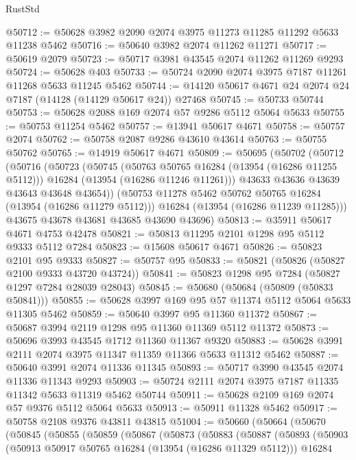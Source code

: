 \begin{lexlean}{RustStd}
\begin{coremodule}
@50712 := @50628 @3982 @2090 @2074 @3975 @11273 @11285 @11292 @5633 @11238 @5462
@50716 := @50640 @3982 @2074 @11262 @11271
@50717 := @50619 @2079
@50723 := @50717 @3981 @43545 @2074 @11262 @11269 @9293
@50724 := @50628 @403
@50733 := @50724 @2090 @2074 @3975 @7187 @11261 @11268 @5633 @11245 @5462
@50744 := @14120 @50617 @4671 @24 @2074 @24 @7187 (@14128 (@14129 @50617 @24)) @27468
@50745 := @50733 @50744
@50753 := @50628 @2088 @169 @2074 @57 @9286 @5112 @5064 @5633
@50755 := @50753 @11254 @5462
@50757 := @13941 @50617 @4671
@50758 := @50757 @2074
@50762 := @50758 @2087 @9286 @43610 @43614
@50763 := @50755 @50762
@50765 := @14919 @50617 @4671
@50809 := @50695
    (@50702
      (@50712
        (@50716
          (@50723
            (@50745
              (@50763 @50765 @16284 (@13954 (@16286 @11255 @5112)))
              @16284
              (@13954 (@16286 @11246 @11261)))
            @43633
            @43636
            @43639
            @43643
            @43648
            @43654))
        (@50753 @11278 @5462 @50762 @50765 @16284 (@13954 (@16286 @11279 @5112)))
        @16284
        (@13954 (@16286 @11239 @11285)))
      @43675
      @43678
      @43681
      @43685
      @43690
      @43696)
@50813 := @35911 @50617 @4671 @4753 @42478
@50821 := @50813 @11295 @2101 @1298 @95 @5112 @9333 @5112 @7284
@50823 := @15608 @50617 @4671
@50826 := @50823 @2101 @95 @9333
@50827 := @50757 @95
@50833 := @50821 (@50826 (@50827 @2100 @9333 @43720 @43724))
@50841 := @50823 @1298 @95 @7284 (@50827 @1297 @7284 @28039 @28043)
@50845 := @50680 (@50684 (@50809 (@50833 @50841)))
@50855 := @50628 @3997 @169 @95 @57 @11374 @5112 @5064 @5633 @11305 @5462
@50859 := @50640 @3997 @95 @11360 @11372
@50867 := @50687 @3994 @2119 @1298 @95 @11360 @11369 @5112 @11372
@50873 := @50696 @3993 @43545 @1712 @11360 @11367 @9320
@50883 := @50628 @3991 @2111 @2074 @3975 @11347 @11359 @11366 @5633 @11312 @5462
@50887 := @50640 @3991 @2074 @11336 @11345
@50893 := @50717 @3990 @43545 @2074 @11336 @11343 @9293
@50903 := @50724 @2111 @2074 @3975 @7187 @11335 @11342 @5633 @11319 @5462 @50744
@50911 := @50628 @2109 @169 @2074 @57 @9376 @5112 @5064 @5633
@50913 := @50911 @11328 @5462
@50917 := @50758 @2108 @9376 @43811 @43815
@51004 := @50660
    (@50664
      (@50670
        (@50845
          (@50855
            (@50859
              (@50867
                (@50873
                  (@50883
                    (@50887
                      (@50893
                        (@50903
                          (@50913 @50917 @50765 @16284 (@13954 (@16286 @11329 @5112)))
                          @16284

\end{coremodule}
\end{lexlean}
